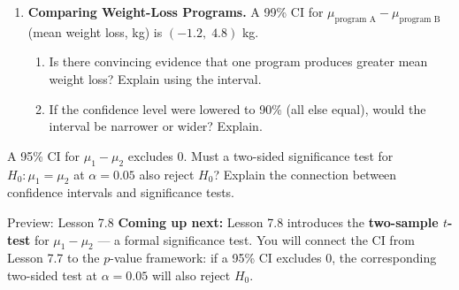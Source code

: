 \documentclass[10pt]{article}
\begin{document}
\begin{enumerate}
\begin{enumerate}[label=\alph*.]
        Team A: $SE_A = \sqrt{\dfrac{8^2}{25} + \dfrac{8^2}{25}} = $ \blank{3cm}

        Team B: $SE_B = \sqrt{\dfrac{8^2}{100} + \dfrac{8^2}{100}} = $ \blank{3cm}

  \item Approximate the margin of error for each team, using $t^* \approx 2.0$.

        Team A: ME $\approx$ \blank{3cm} \qquad Team B: ME $\approx$ \blank{3cm}

  \item By what factor is Team B's interval narrower than Team A's? \writeline
\end{enumerate}

\vspace{0.06in}

\item \textbf{Comparing Weight-Loss Programs.} \quad
A 99\% CI for $\mu_{\text{program A}} - \mu_{\text{program B}}$ (mean weight loss, kg) is
$(-1.2,\; 4.8)$ kg.

\begin{enumerate}[label=\alph*.]
  \item Is there convincing evidence that one program produces greater mean weight loss?
        Explain using the interval. 
  \item If the confidence level were lowered to 90\% (all else equal), would the interval
        be narrower or wider? Explain. \writeline
\end{enumerate}

\end{enumerate}

\begin{extensionbox}
A 95\% CI for $\mu_1 - \mu_2$ excludes 0. Must a two-sided significance test for
$H_0: \mu_1 = \mu_2$ at $\alpha = 0.05$ also reject $H_0$? Explain the connection
between confidence intervals and significance tests.
\end{extensionbox}

\begin{notesbox}{Preview: Lesson 7.8}
\textbf{Coming up next:} Lesson 7.8 introduces the \textbf{two-sample $t$-test} for
$\mu_1 - \mu_2$ --- a formal significance test. You will connect the CI from Lesson 7.7
to the $p$-value framework: if a 95\% CI excludes 0, the corresponding two-sided test
at $\alpha = 0.05$ will also reject $H_0$.
\end{notesbox}
\end{document}
